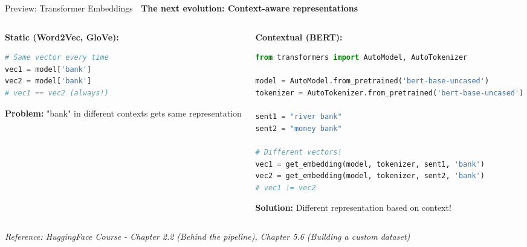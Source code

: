 \documentclass[aspectratio=169]{beamer}
\begin{document}
\begin{frame}[fragile]{Preview: Transformer Embeddings 🔮}
\textbf{The next evolution: Context-aware representations}

\vspace{1em}

\begin{columns}[T]
\begin{column}{0.48\textwidth}
\textbf{Static (Word2Vec, GloVe):}
\begin{lstlisting}[language=Python]
# Same vector every time
vec1 = model['bank']
vec2 = model['bank']
# vec1 == vec2 (always!)
\end{lstlisting}

\vspace{0.5em}
\textbf{Problem:} "bank" in different contexts gets same representation
\end{column}

\begin{column}{0.48\textwidth}
\textbf{Contextual (BERT):}
\begin{lstlisting}[language=Python]
from transformers import AutoModel, AutoTokenizer

model = AutoModel.from_pretrained('bert-base-uncased')
tokenizer = AutoTokenizer.from_pretrained('bert-base-uncased')

sent1 = "river bank"
sent2 = "money bank"

# Different vectors!
vec1 = get_embedding(model, tokenizer, sent1, 'bank')
vec2 = get_embedding(model, tokenizer, sent2, 'bank')
# vec1 != vec2
\end{lstlisting}

\vspace{0.5em}
\textbf{Solution:} Different representation based on context!
\end{column}
\end{columns}

\vspace{1em}
\small
\textit{Reference: HuggingFace Course - Chapter 2.2 (Behind the pipeline), Chapter 5.6 (Building a custom dataset)}
\end{frame}
\end{document}
